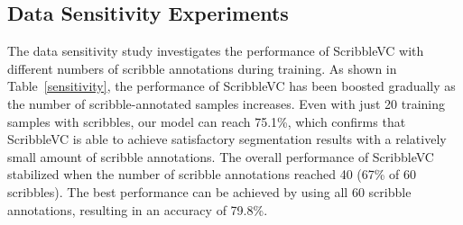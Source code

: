 \documentclass[sigconf,natbib=false]{acmart}
\begin{document}
\subsection{Data Sensitivity Experiments}
The data sensitivity study investigates the performance of ScribbleVC with different numbers of scribble annotations during training. 
As shown in Table~\ref{sensitivity}, the performance of ScribbleVC has been boosted gradually as the number of scribble-annotated samples increases. Even with just 20 training samples with scribbles, our model can reach 75.1\%, which confirms that ScribbleVC is able to achieve satisfactory segmentation results with a relatively small amount of scribble annotations. The overall performance of ScribbleVC stabilized when the number of scribble annotations reached 40 (67\% of 60 scribbles). The best performance can be achieved by using all 60 scribble annotations, resulting in an accuracy of 79.8\%. 
\vspace{-6mm}
\begin{table}[!ht]\tiny
\setlength{\abovecaptionskip}{0mm}
  \centering
  \caption{Data sensitivity study: the performance of ScribbleVC with the different numbers of scribbles for training.}
  \label{sensitivity}\vspace{-2mm}
\end{table}\vspace{-4mm}
\end{document}
